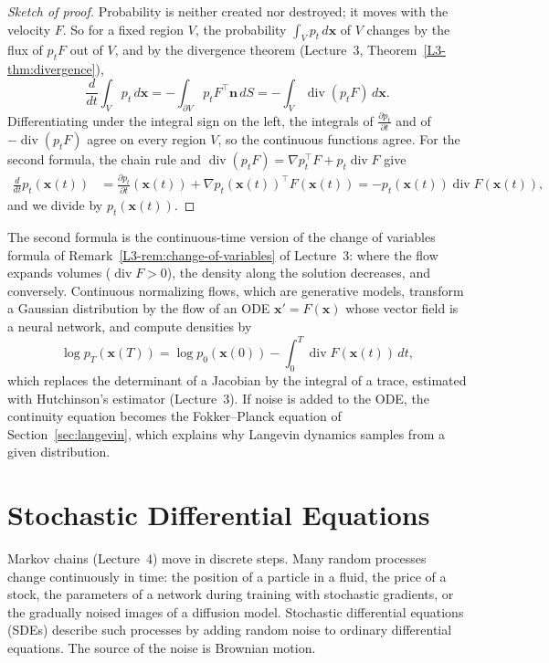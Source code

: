 \documentclass[11pt]{article}
\theoremstyle{definition}
\theoremstyle{plain}
\theoremstyle{remark}
\DeclareMathOperator{\Div}{div}
\begin{document}
\begin{proof}[Sketch of proof]
    Probability is neither created nor destroyed; it moves with the velocity $F$. So for a fixed region $V$, the probability $\int_V p_t\, d\mathbf{x}$ of $V$ changes by the flux of $p_tF$ out of $V$, and by the divergence theorem (Lecture~3, Theorem~\ref{L3-thm:divergence}),
    \[\frac{d}{dt}\int_V p_t\, d\mathbf{x} = -\int_{\partial V} p_tF^\top\mathbf{n}\, dS = -\int_V \Div(p_tF)\, d\mathbf{x}.\]
    Differentiating under the integral sign on the left, the integrals of $\frac{\partial p_t}{\partial t}$ and of $-\Div(p_tF)$ agree on every region $V$, so the continuous functions agree. For the second formula, the chain rule and $\Div(p_tF) = \nabla p_t^\top F + p_t\Div F$ give
    \begin{align*}
        \frac{d}{dt}p_t(\mathbf{x}(t)) &= \frac{\partial p_t}{\partial t}(\mathbf{x}(t)) + \nabla p_t(\mathbf{x}(t))^\top F(\mathbf{x}(t)) = -p_t(\mathbf{x}(t))\Div F(\mathbf{x}(t)),
    \end{align*}
    and we divide by $p_t(\mathbf{x}(t))$.
\end{proof}

The second formula is the continuous-time version of the change of variables formula of Remark~\ref{L3-rem:change-of-variables} of Lecture~3: where the flow expands volumes ($\Div F > 0$), the density along the solution decreases, and conversely. Continuous normalizing flows, which are generative models, transform a Gaussian distribution by the flow of an ODE $\mathbf{x}' = F(\mathbf{x})$ whose vector field is a neural network, and compute densities by
\[\log p_T(\mathbf{x}(T)) = \log p_0(\mathbf{x}(0)) - \int_0^T \Div F(\mathbf{x}(t))\, dt,\]
which replaces the determinant of a Jacobian by the integral of a trace, estimated with Hutchinson's estimator (Lecture~3). If noise is added to the ODE, the continuity equation becomes the Fokker--Planck equation of Section~\ref{sec:langevin}, which explains why Langevin dynamics samples from a given distribution.

\section{Stochastic Differential Equations}\label{sec:sde}

Markov chains (Lecture~4) move in discrete steps. Many random processes change continuously in time: the position of a particle in a fluid, the price of a stock, the parameters of a network during training with stochastic gradients, or the gradually noised images of a diffusion model. Stochastic differential equations (SDEs) describe such processes by adding random noise to ordinary differential equations. The source of the noise is Brownian motion.
\end{document}

